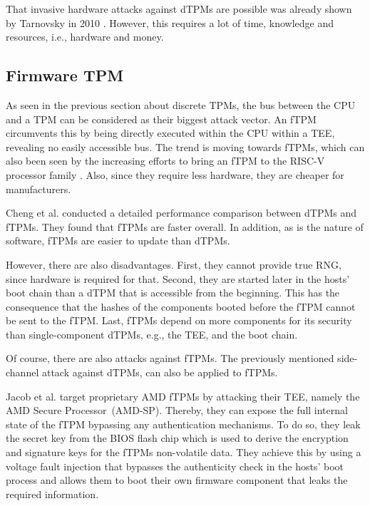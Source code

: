 That invasive hardware attacks against dTPMs are possible was already shown by Tarnovsky in 2010 \cite{tarnovsky}. However, this requires a lot of time, knowledge and resources, i.e., hardware and money.


\subsection{Firmware TPM}


As seen in the previous section about discrete TPMs, the bus between the CPU and a TPM can be considered as their biggest attack vector. An fTPM \cite{Raj2015, 197213} circumvents this by being directly executed within the CPU within a \ac{TEE}, revealing no easily accessible bus.
The trend is moving towards fTPMs, which can also been seen by the increasing efforts to bring an fTPM to the RISC-V processor family \cite{Boubakri2021}. Also, since they require less hardware, they are cheaper for manufacturers.

Cheng et al. \cite{Cheng2020} conducted a detailed performance comparison between dTPMs and fTPMs. They found that fTPMs are faster overall. %
In addition, as is the nature of software, fTPMs are easier to update than dTPMs.

However, there are also disadvantages. First, they cannot provide true RNG, since hardware is required for that. Second, they are started later in the hosts' boot chain than a dTPM that is accessible from the beginning. This has the consequence that the hashes of the components booted before the fTPM cannot be sent to the fTPM. Last, fTPMs depend on more components for its security than single-component dTPMs, e.g., the \ac{TEE}, and the boot chain.

Of course, there are also attacks against fTPMs.
The previously mentioned side-channel attack \cite{Moghimi2019} against dTPMs, can also be applied to fTPMs.

Jacob et al. \cite{Jacob2023} target proprietary AMD fTPMs by attacking their \ac{TEE}, namely the AMD Secure Processor~(AMD-SP). Thereby, they can expose the full internal state of the fTPM bypassing any authentication mechanisms. To do so, they leak the secret key from the BIOS flash chip which is used to derive the encryption and signature keys for the fTPMs non-volatile data. They achieve this by using a voltage fault injection that bypasses the authenticity check in the hosts' boot process and allows them to boot their own firmware component that leaks the required information.

